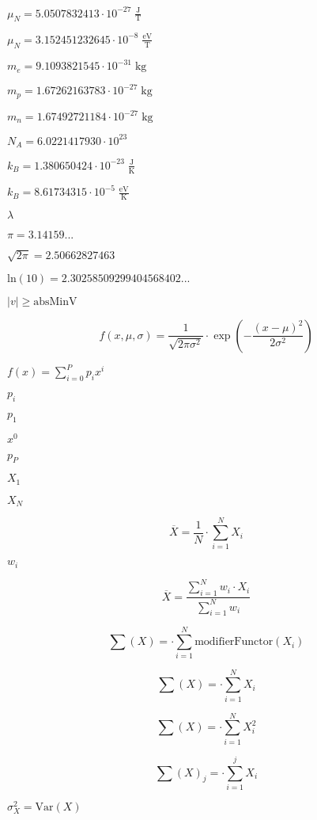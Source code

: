 \documentclass{article}
\begin{document}
$ \mu_N=5.0507832413\cdot 10^{-27}\;\mathrm{\frac{J}{T}} $
\pagebreak

$ \mu_N=3.152451232645\cdot 10^{-8}\;\mathrm{\frac{eV}{T}} $
\pagebreak

$ m_e= 9.1093821545\cdot 10^{-31}\;\mathrm{kg} $
\pagebreak

$ m_p= 1.67262163783\cdot 10^{-27}\;\mathrm{kg} $
\pagebreak

$ m_n= 1.67492721184\cdot 10^{-27}\;\mathrm{kg} $
\pagebreak

$ N_A= 6.0221417930\cdot 10^{23} $
\pagebreak

$ k_B=1.380650424\cdot 10^{-23}\;\mathrm{\frac{J}{K}} $
\pagebreak

$ k_B=8.61734315\cdot 10^{-5}\;\mathrm{\frac{eV}{K}} $
\pagebreak

$ \lambda $
\pagebreak

$ \pi=3.14159... $
\pagebreak

$ \sqrt{2\pi}=2.50662827463 $
\pagebreak

$ \mbox{ln}(10)=2.30258509299404568402... $
\pagebreak

$ |v|\geq \mbox{absMinV} $
\pagebreak

\[ f(x,\mu, \sigma)=\frac{1}{\sqrt{2\pi\sigma^2}}\cdot\exp\left(-\frac{(x-\mu)^2}{2\sigma^2}\right) \]
\pagebreak

$ f(x)=\sum\limits_{i=0}^Pp_ix^i $
\pagebreak

$ p_i $
\pagebreak

$ p_1 $
\pagebreak

$ x^0 $
\pagebreak

$ p_P $
\pagebreak

$ X_1 $
\pagebreak

$ X_N $
\pagebreak

\[ \overline{X}=\frac{1}{N}\cdot\sum\limits_{i=1}^{N}X_i \]
\pagebreak

$ w_i $
\pagebreak

\[ \overline{X}=\frac{\sum\limits_{i=1}^{N}w_i\cdot X_i}{\sum\limits_{i=1}^{N}w_i} \]
\pagebreak

\[ \sum(X)=\cdot\sum\limits_{i=1}^{N}\mbox{modifierFunctor}(X_i) \]
\pagebreak

\[ \sum(X)=\cdot\sum\limits_{i=1}^{N}X_i \]
\pagebreak

\[ \sum(X)=\cdot\sum\limits_{i=1}^{N}X_i^2 \]
\pagebreak

\[ \sum(X)_j=\cdot\sum\limits_{i=1}^{j}X_i \]
\pagebreak

$ \sigma_X^2=\mbox{Var}(X) $
\pagebreak
\end{document}
